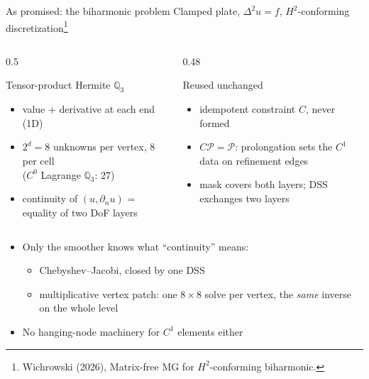 \documentclass{beamer}
\begin{document}
\begin{frame}{As promised: the biharmonic problem}
    Clamped plate, $\Delta^2 u = f$, \alert{$H^2$-conforming} discretization\footnote{Wichrowski (2026), Matrix-free MG
        for $H^2$-conforming biharmonic.}
    \begin{columns}[T]
        \begin{column}{0.5\textwidth}
            \begin{block}{Tensor-product Hermite $\mathbb Q_3$}
                \begin{itemize}
                    \small
                    \item value + derivative at each end (1D)
                    \item $2^d = 8$ unknowns per vertex, $8$ per cell\\ ($C^0$ Lagrange $\mathbb Q_3$: $27$)
                    \item continuity of $(u, \partial_n u)$ = equality of \alert{two DoF layers}
                \end{itemize}
            \end{block}
        \end{column}
        \begin{column}{0.48\textwidth}
            \begin{block}{Reused unchanged}
                \begin{itemize}
                    \small
                    \item idempotent constraint $C$, never formed
                    \item $C\mathcal P = \mathcal P$: prolongation sets the $C^1$ data on refinement edges
                    \item mask covers both layers; DSS exchanges two layers
                \end{itemize}
            \end{block}
        \end{column}
    \end{columns}
    \vfill
    \pause
    \begin{itemize}
        \small
        \item Only the smoother knows what ``continuity'' means:
              \begin{itemize}
                  \item Chebyshev--Jacobi, closed by one DSS
                  \item multiplicative vertex patch: one $8\times 8$ solve per vertex, the \emph{same} inverse on the whole level
              \end{itemize}
        \item No hanging-node machinery for $C^1$ elements either
    \end{itemize}
\end{frame}
\end{document}
